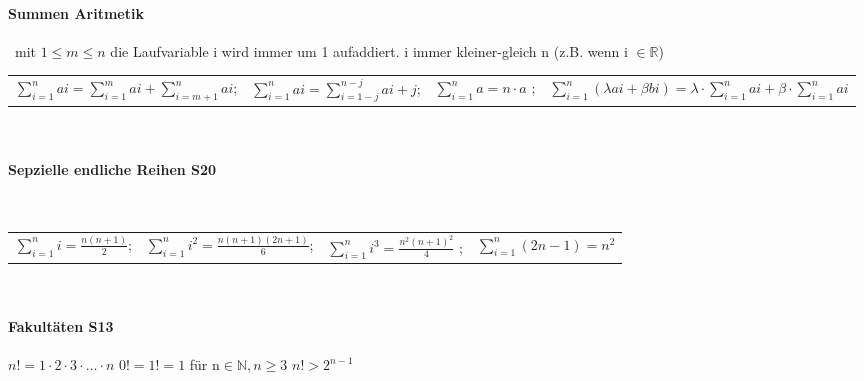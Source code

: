 \documentclass[6pt,a4paper]{scrartcl}
\begin{document}
\begin{multicols*}{2}
\paragraph{Summen Aritmetik}\
mit $1\leq m\leq n$  \qquad die  Laufvariable i wird immer um 1 aufaddiert. i immer kleiner-gleich n (z.B. wenn i $\in \mathbb R $)\\

\begin{tabulary}{15cm}{|l|c|c|r|}
	$ \sum\limits_{i = 1}^{n}ai = \sum\limits_{i = 1}^{m}ai + \sum\limits_{i = m+1}^{n}ai  $;\qquad	&	
	$ \sum\limits_{i = 1}^{n}ai = \sum\limits_{i = 1-j}^{n-j}ai+j  $;\qquad	& 
	$ \sum\limits_{i = 1}^{n}a = n \cdot a  $ ;	\qquad	&
	$ \sum\limits_{i = 1}^{n}(\lambda ai+\beta bi) = \lambda\cdot \sum\limits_{i = 1}^{n}ai + \beta\cdot \sum\limits_{i = 1}^{n}ai  $ \qquad \\

\end{tabulary}\\






\paragraph{Sepzielle endliche Reihen \color{red} S20}\


\begin{tabulary}{15cm}{Lccr}
	$ \sum\limits_{i = 1}^{n}i = \frac{n(n+1)}{2}  $; \qquad	&	
	$ \sum\limits_{i = 1}^{n}i^{2} = \frac{n(n+1)(2n+1)}{6}  $;\qquad	& 
	$ \sum\limits_{i = 1}^{n}i^{3} = \frac{n^{2}(n+1)^{2}}{4}  $ ;	\qquad	&
	$ \sum\limits_{i = 1}^{n}(2n-1) = n^{2}  $\qquad\qquad \\
	
\end{tabulary}\\



\paragraph{Fakultäten \color{red} S13} %
\label{par:fakultaeten}
$n! = 1 \cdot 2 \cdot 3 \cdot \ldots \cdot n$ \qquad  $0! = 1! = 1$ \qquad\qquad  für n$\in \mathbb N, n\geq3$ \qquad\qquad $ n! > 2^{n-1}$  \\


\end{multicols*}
\end{document}
